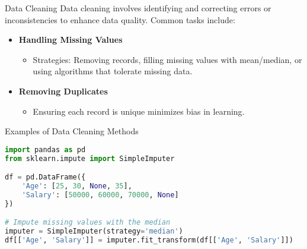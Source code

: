 \documentclass[aspectratio=169]{beamer}
\begin{document}
\begin{frame}[fragile]{Data Cleaning}
    Data cleaning involves identifying and correcting errors or inconsistencies to enhance data quality. Common tasks include:
    
    \begin{itemize}
        \item \textbf{Handling Missing Values}
            \begin{itemize}
                \item Strategies: Removing records, filling missing values with mean/median, or using algorithms that tolerate missing data.
            \end{itemize}
        \item \textbf{Removing Duplicates}
            \begin{itemize}
                \item Ensuring each record is unique minimizes bias in learning.
            \end{itemize}
    \end{itemize}

    \begin{block}{Examples of Data Cleaning Methods}
        \begin{lstlisting}[language=Python]
import pandas as pd
from sklearn.impute import SimpleImputer

df = pd.DataFrame({
    'Age': [25, 30, None, 35],
    'Salary': [50000, 60000, 70000, None]
})

# Impute missing values with the median
imputer = SimpleImputer(strategy='median')
df[['Age', 'Salary']] = imputer.fit_transform(df[['Age', 'Salary']])
        \end{lstlisting}
    \end{block}
\end{frame}
\end{document}

